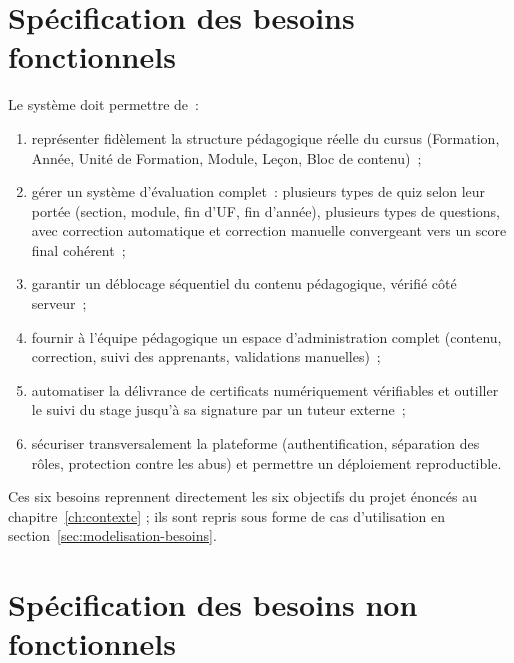 \section{Spécification des besoins fonctionnels}
\label{sec:besoins-fonctionnels}

Le système doit permettre de~:
\begin{enumerate}[label=\textbf{BF\arabic*.}]
  \item représenter fidèlement la structure pédagogique réelle du cursus
    (Formation, Année, Unité de Formation, Module, Leçon, Bloc de contenu)~;
  \item gérer un système d'évaluation complet~: plusieurs types de quiz
    selon leur portée (section, module, fin d'UF, fin d'année), plusieurs
    types de questions, avec correction automatique et correction
    manuelle convergeant vers un score final cohérent~;
  \item garantir un déblocage séquentiel du contenu pédagogique, vérifié
    côté serveur~;
  \item fournir à l'équipe pédagogique un espace d'administration complet
    (contenu, correction, suivi des apprenants, validations manuelles)~;
  \item automatiser la délivrance de certificats numériquement
    vérifiables et outiller le suivi du stage jusqu'à sa signature par un
    tuteur externe~;
  \item sécuriser transversalement la plateforme (authentification,
    séparation des rôles, protection contre les abus) et permettre un
    déploiement reproductible.
\end{enumerate}

Ces six besoins reprennent directement les six objectifs du projet
énoncés au chapitre~\ref{ch:contexte} ; ils sont repris sous forme de
cas d'utilisation en section~\ref{sec:modelisation-besoins}.

\section{Spécification des besoins non fonctionnels}

